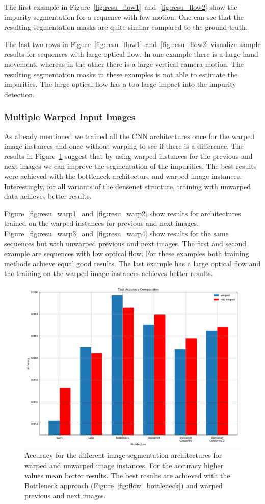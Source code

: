 The first example in Figure~\ref{fig:resu_flow1}~and~\ref{fig:resu_flow2} show the impurity segmentation for a sequence with few motion. One can see that the resulting segmentation masks are quite similar compared to the ground-truth.  

The last two rows in Figure~\ref{fig:resu_flow1}~and~\ref{fig:resu_flow2} visualize sample results for sequences with large optical flow. In one example there is a large hand movement, whereas in the other there is a large vertical camera motion. The resulting segmentation masks in these examples is not able to estimate the impurities. The large optical flow has a too large impact into the impurity detection.

\subsubsection{Multiple Warped Input Images}
\label{ssec:num533}
As already mentioned we trained all the CNN architectures once for the warped image instances and once without warping to see if there is a difference.
The results in Figure~\ref{fig:resu_warp_test_acc} suggest that by using warped instances for the previous and next images we can improve the segmentation of the impurities. The best results were achieved with the bottleneck architecture and warped image instances. Interestingly, for all variants of the densenet structure, training with unwarped data achieves better results.

Figure~\ref{fig:resu_warp1}~and~\ref{fig:resu_warp2} show results for architectures trained on the warped instances for previous and next images. Figure~\ref{fig:resu_warp3}~and~\ref{fig:resu_warp4} show results for the same sequences but with unwarped previous and next images. The first and second example are sequences with low optical flow. For these examples both training methods achieve equal good results. The last example has a large optical flow and the training on the warped image instances achieves better results.

\begin{figure}[H]
	\centering
	\includegraphics[width=.6\linewidth]{results_warp/Test_Accuracy_Comparision.png}
	\caption[figure]{Accuracy for the different image segmentation architectures for warped and unwarped image instances. For the accuracy higher values mean better results. The best results are achieved with the Bottleneck approach (Figure~\ref{fig:flow_bottleneck}) and warped previous and next images.}
	\label{fig:resu_warp_test_acc}
\end{figure}


